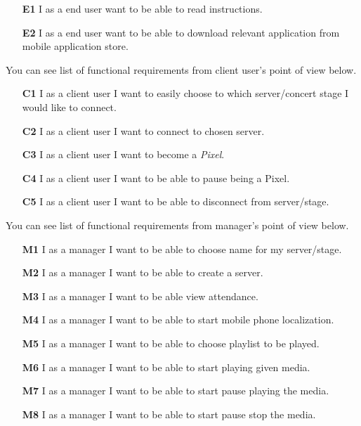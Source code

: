 \begin{enumerate}
	\item[\textbf{E1}] \label{req_E1}
		I as a end user want to be able to read instructions.
	\item[\textbf{E2}] \label{req_E2}
		I as a end user want to be able to download relevant application from mobile application store.
\end{enumerate}

You can see list of functional requirements from client user's point of view below.
\begin{enumerate}
	\item[\textbf{C1}] \label{req_C1}
		I as a client user I want to easily choose to which server/concert stage I would like to connect.
	\item[\textbf{C2}] \label{req_C2}
		I as a client user I want to connect to chosen server.
	\item[\textbf{C3}] \label{req_C3}
		I as a client user I want to become a \emph{Pixel}.
	\item[\textbf{C4}] \label{req_C4}
		I as a client user I want to be able to pause being a Pixel.
	\item[\textbf{C5}] \label{req_C5}
		I as a client user I want to be able to disconnect from server/stage.
\end{enumerate}


You can see list of functional requirements from manager's point of view below.
\begin{enumerate}
	\item[\textbf{M1}] \label{req_M1}
		I as a manager I want to be able to choose name for my server/stage.
	\item[\textbf{M2}] \label{req_M2}
		I as a manager I want to be able to create a server.
	\item[\textbf{M3}] \label{req_M3}
		I as a manager I want to be able view attendance.
	\item[\textbf{M4}] \label{req_M4}
		I as a manager I want to be able to start mobile phone localization.
	\item[\textbf{M5}] \label{req_M5}
		I as a manager I want to be able to choose playlist to be played.
	\item[\textbf{M6}] \label{req_M6}
		I as a manager I want to be able to start playing given media.
	\item[\textbf{M7}] \label{req_M7}
		I as a manager I want to be able to start pause playing the media.
	\item[\textbf{M8}] \label{req_M8}
		I as a manager I want to be able to start pause stop the media.
\end{enumerate}

